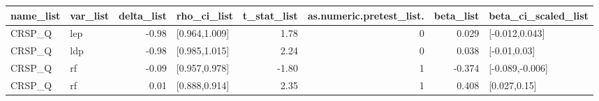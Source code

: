 \begin{table}[ht]
\centering
\begin{tabular}{llrlrrrl}
  \hline
name\_list & var\_list & delta\_list & rho\_ci\_list & t\_stat\_list & as.numeric.pretest\_list. & beta\_list & beta\_ci\_scaled\_list \\ 
  \hline
CRSP\_Q & lep & -0.98 & [0.964,1.009] & 1.78 & 0 & 0.029 & [-0.012,0.043] \\ 
  CRSP\_Q & ldp & -0.98 & [0.985,1.015] & 2.24 & 0 & 0.038 & [-0.01,0.03] \\ 
  CRSP\_Q & rf & -0.09 & [0.957,0.978] & -1.80 & 1 & -0.374 & [-0.089,-0.006] \\ 
  CRSP\_Q & rf & 0.01 & [0.888,0.914] & 2.35 & 1 & 0.408 & [0.027,0.15] \\ 
   \hline
\end{tabular}
\end{table}
